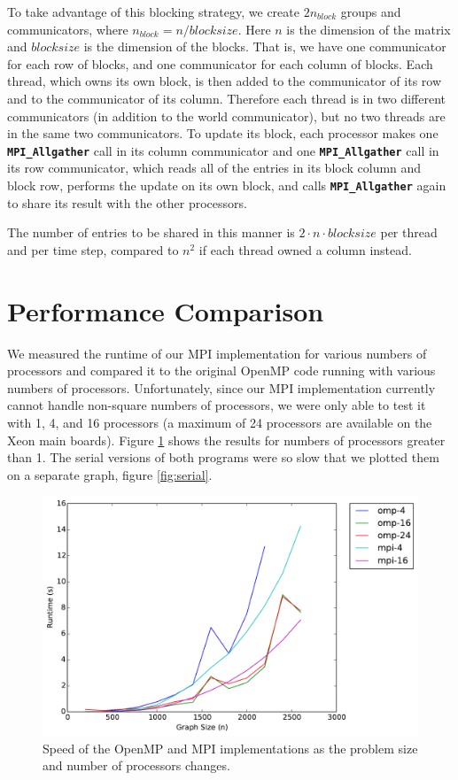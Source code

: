 \documentclass[11pt]{article}
\begin{document}
To take advantage of this blocking strategy, we create $2n_{block}$ groups and communicators, where $n_{block}=n/blocksize$. Here $n$  is the dimension of the matrix and $blocksize$ is the dimension of the blocks. That is, we have one communicator for each row of blocks, and one communicator for each column of blocks. Each thread, which owns its own block, is then added to the communicator of its row and to the communicator of its column. Therefore each thread is in two different communicators (in addition to the world communicator), but no two threads are in the same two communicators. To update its block, each processor makes one \textbf{\texttt{MPI\_Allgather}} call in its column communicator and one \textbf{ \texttt{MPI\_Allgather}} call in its row communicator, which reads all of the entries in its block column and block row, performs the update on its own block, and calls \textbf{\texttt{MPI\_Allgather}} again to share its result with the other processors.

The number of entries to be shared in this manner is $2 \cdot n \cdot blocksize$ per thread and per time step, compared to $n^2$ if each thread owned a column instead.

\section{Performance Comparison}
We measured the runtime of our MPI implementation for various numbers of processors and compared it to the original OpenMP code running with various numbers of processors.
Unfortunately, since our MPI implementation currently cannot handle non-square numbers of processors, we were only able to test it with 1, 4, and 16 processors (a maximum of 24 processors are available on the Xeon main boards).
Figure \ref{fig:mpi-omp} shows the results for numbers of processors greater than 1.
The serial versions of both programs were so slow that we plotted them on a separate graph, figure \ref{fig:serial}.

\begin{figure}[h]
	\centering
	\includegraphics[width=.8\textwidth]{mpi_omp_comparison.pdf}
	\caption{Speed of the OpenMP and MPI implementations as the problem size and number of processors changes.}
	\label{fig:mpi-omp}
\end{figure}
\end{document}
